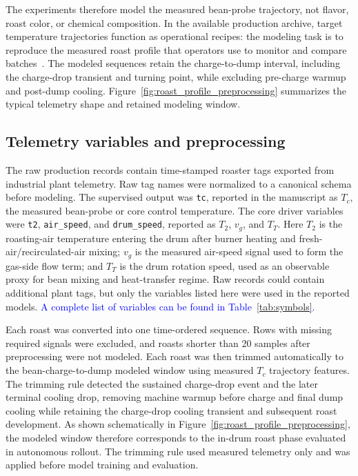 \documentclass[fleqn,10pt]{wlscirep}
\newcommand{\rev}[1]{\textcolor{blue}{#1}}
\begin{document}
The experiments therefore model the measured bean-probe trajectory, not flavor, roast color, or chemical composition. In the available production archive, target temperature trajectories function as operational recipes: the modeling task is to reproduce the measured roast profile that operators use to monitor and compare batches~\cite{rao2014}. The modeled sequences retain the charge-to-dump interval, including the charge-drop transient and turning point, while excluding pre-charge warmup and post-dump cooling. Figure~\ref{fig:roast_profile_preprocessing} summarizes the typical telemetry shape and retained modeling window.

\subsection*{Telemetry variables and preprocessing}

The raw production records contain time-stamped roaster tags exported from industrial plant telemetry. Raw tag names were normalized to a canonical schema before modeling. The supervised output was \texttt{tc}, reported in the manuscript as $T_c$, the measured bean-probe or core control temperature. The core driver variables were \texttt{t2}, \texttt{air\_speed}, and \texttt{drum\_speed}, reported as $T_2$, $v_g$, and $T_T$. Here $T_2$ is the roasting-air temperature entering the drum after burner heating and fresh-air/recirculated-air mixing; $v_g$ is the measured air-speed signal used to form the gas-side flow term; and $T_T$ is the drum rotation speed, used as an observable proxy for bean mixing and heat-transfer regime. Raw records could contain additional plant tags, but only the variables listed here were used in the reported models. \rev{A complete list of variables can be found in Table~\ref{tab:symbols}.}

Each roast was converted into one time-ordered sequence. Rows with missing required signals were excluded, and roasts shorter than 20 samples after preprocessing were not modeled. Each roast was then trimmed automatically to the bean-charge-to-dump modeled window using measured $T_c$ trajectory features. The trimming rule detected the sustained charge-drop event and the later terminal cooling drop, removing machine warmup before charge and final dump cooling while retaining the charge-drop cooling transient and subsequent roast development. As shown schematically in Figure~\ref{fig:roast_profile_preprocessing}, the modeled window therefore corresponds to the in-drum roast phase evaluated in autonomous rollout. The trimming rule used measured telemetry only and was applied before model training and evaluation.
\end{document}
